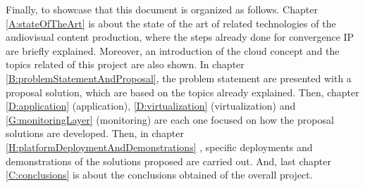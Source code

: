 Finally, to showcase that this document is organized as follows. Chapter \ref{A:stateOfTheArt} is about the state of the art of related technologies of the audiovisual content production, where the steps already done for convergence IP are briefly explained. Moreover, an introduction of the cloud concept and the topics related of this project are also shown. In chapter \ref{B:problemStatementAndProposal}, the problem statement are presented with a proposal solution, which are based on the topics already explained. Then, chapter \ref{D:application} (application), \ref{D:virtualization} (virtualization) and \ref{G:monitoringLayer} (monitoring) are each one focused on how the proposal solutions are developed. Then, in chapter \ref{H:platformDeploymentAndDemonstrations}
, specific deployments and demonstrations of the solutions proposed are carried out. And, last chapter \ref{C:conclusions} is about the conclusions obtained of the overall project.





